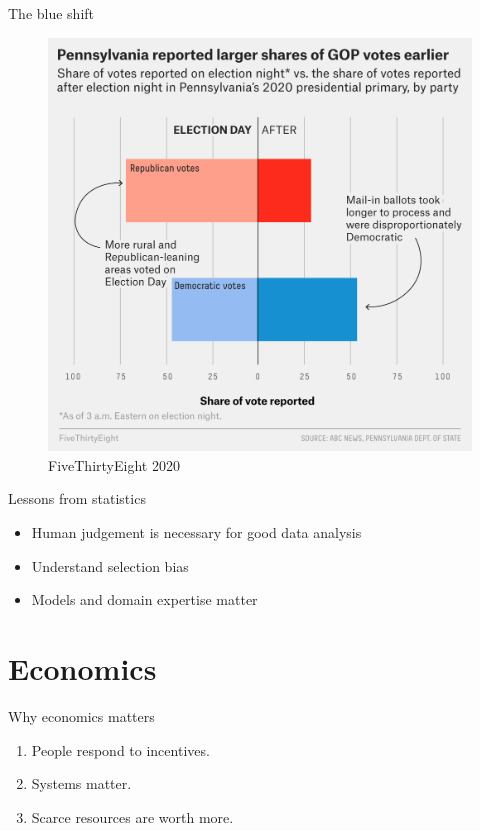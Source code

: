 \documentclass[
  ignorenonframetext,
  aspectratio=54,
]{beamer}
\providecommand{\tightlist}{%
  \setlength{\itemsep}{0pt}\setlength{\parskip}{0pt}}
\begin{document}
\begin{frame}{The blue shift}
\protect\hypertarget{the-blue-shift}{}
\begin{figure}
\centering
\includegraphics[width=\textwidth,height=0.8\textheight]{exhibit/fig/blue-shift.png}
\caption{FiveThirtyEight 2020}
\end{figure}
\end{frame}

\begin{frame}{Lessons from statistics}
\protect\hypertarget{lessons-from-statistics}{}
\begin{itemize}
\tightlist
\item
  Human judgement is necessary for good data analysis
\item
  Understand selection bias
\item
  Models and domain expertise matter
\end{itemize}
\end{frame}

\hypertarget{economics}{%
\section{Economics}\label{economics}}

\begin{frame}{Why economics matters}
\protect\hypertarget{why-economics-matters}{}
\begin{enumerate}
\tightlist
\item
  People respond to incentives.
\item
  Systems matter.
\item
  Scarce resources are worth more.
\end{enumerate}
\end{frame}
\end{document}
